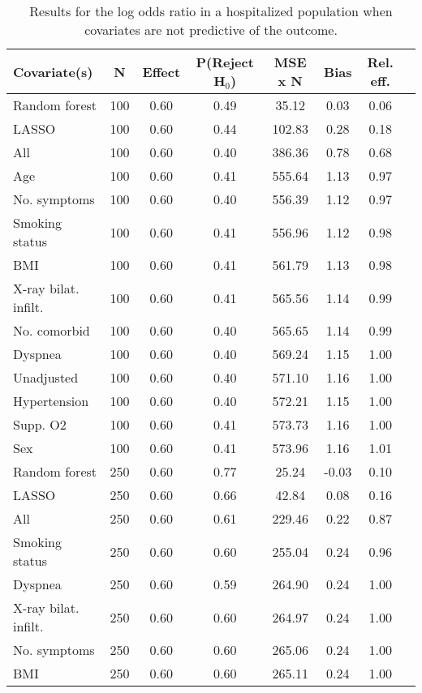 \documentclass{article}
\begin{document}
\clearpage

{\tabcolsep=6pt  %
\begin{longtable}{lccccccc}
\caption{Results for the log odds ratio in a hospitalized population when covariates are not predictive of the outcome.} \\
Covariate(s) & N & Effect & P(Reject H$_0$) & MSE x N & Bias & Rel. eff.\\ \midrule
Random forest & 100 & 0.60 & 0.49 &  35.12 &  0.03 & 0.06 \\ 
LASSO & 100 & 0.60 & 0.44 & 102.83 &  0.28 & 0.18 \\ 
All & 100 & 0.60 & 0.40 & 386.36 &  0.78 & 0.68 \\ 
Age & 100 & 0.60 & 0.41 & 555.64 &  1.13 & 0.97 \\ 
No. symptoms & 100 & 0.60 & 0.40 & 556.39 &  1.12 & 0.97 \\ 
Smoking status & 100 & 0.60 & 0.41 & 556.96 &  1.12 & 0.98 \\ 
BMI & 100 & 0.60 & 0.41 & 561.79 &  1.13 & 0.98 \\ 
X-ray bilat. infilt. & 100 & 0.60 & 0.41 & 565.56 &  1.14 & 0.99 \\ 
No. comorbid & 100 & 0.60 & 0.40 & 565.65 &  1.14 & 0.99 \\ 
Dyspnea & 100 & 0.60 & 0.40 & 569.24 &  1.15 & 1.00 \\ 
Unadjusted & 100 & 0.60 & 0.40 & 571.10 &  1.16 & 1.00 \\ 
Hypertension & 100 & 0.60 & 0.40 & 572.21 &  1.15 & 1.00 \\ 
Supp. O2 & 100 & 0.60 & 0.41 & 573.73 &  1.16 & 1.00 \\ 
Sex & 100 & 0.60 & 0.41 & 573.96 &  1.16 & 1.01 \\ \midrule() 
Random forest & 250 & 0.60 & 0.77 &  25.24 & -0.03 & 0.10 \\ 
LASSO & 250 & 0.60 & 0.66 &  42.84 &  0.08 & 0.16 \\ 
All & 250 & 0.60 & 0.61 & 229.46 &  0.22 & 0.87 \\ 
Smoking status & 250 & 0.60 & 0.60 & 255.04 &  0.24 & 0.96 \\ 
Dyspnea & 250 & 0.60 & 0.59 & 264.90 &  0.24 & 1.00 \\ 
X-ray bilat. infilt. & 250 & 0.60 & 0.60 & 264.97 &  0.24 & 1.00 \\ 
No. symptoms & 250 & 0.60 & 0.60 & 265.06 &  0.24 & 1.00 \\ 
BMI & 250 & 0.60 & 0.60 & 265.11 &  0.24 & 1.00 \\ 

\end{longtable}}
\end{document}
